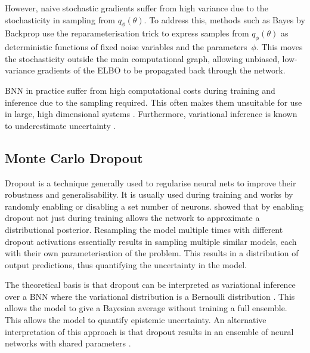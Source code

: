However, naive stochastic gradients suffer from high variance due to the stochasticity in sampling from $q_\phi(\theta)$.
To address this, methods such as Bayes by Backprop
\parencite{blundellWeightUncertaintyNeural2015} use the reparameterisation trick
\parencite{kingmaAutoEncodingVariationalBayes2014} to express samples from $q_\phi(\theta)$ as deterministic functions of fixed noise variables and the parameters~$\phi$.
This moves the stochasticity outside the main computational graph, allowing unbiased, low-variance gradients of the ELBO to be propagated back through the network.

BNN in practice suffer from high computational costs during training and inference due to the sampling required. This
often makes them unsuitable for use in large, high dimensional systems
\parencite{willardIntegratingPhysicsBasedModelling2022}. Furthermore, variational inference is known to underestimate
uncertainty \parencite{kruegerBayesianHypernetworks2017}.

\subsection{Monte Carlo Dropout}
\label{subsec:mc_dropout}
Dropout is a technique generally used to regularise neural nets to improve their robustness and generalisability. It is
usually used during training and works by randomly enabling or disabling a set number of neurons.
\textcite{galDropoutBayesianApproximation2016} showed that by enabling dropout not just during training allows the network to
approximate a distributional posterior. Resampling the model multiple times with different dropout activations
essentially results in sampling multiple similar models, each with their own parameterisation of the problem. This
results in a distribution of output predictions, thus quantifying the uncertainty in the model.

The theoretical basis is that dropout can be interpreted as variational inference over a BNN where
the variational distribution is a Bernoulli distribution \parencite{galDropoutBayesianApproximation2016}. This allows
the model to give a Bayesian average without training a full ensemble. This allows the model to quantify epistemic
uncertainty. An alternative interpretation of this approach is that dropout results in an ensemble of neural networks
with shared parameters \parencite{lakshminarayananSimpleScalablePredictive2017}. 

